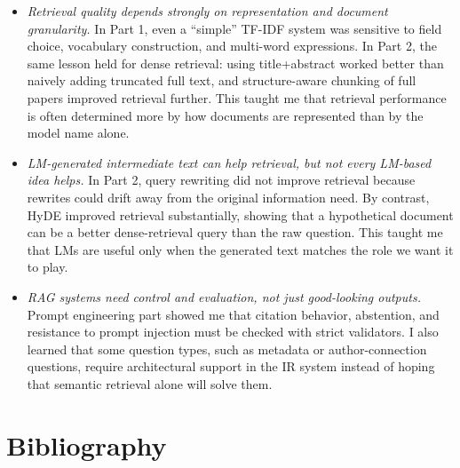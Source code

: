 \documentclass[a4paper,11pt]{article}
\begin{document}
\begin{itemize}
  \item \textit{Retrieval quality depends strongly on representation and document granularity.} In Part 1, even a ``simple'' TF-IDF system was sensitive to field choice, vocabulary construction, and multi-word expressions. In Part 2, the same lesson held for dense retrieval: using title+abstract worked better than naively adding truncated full text, and structure-aware chunking of full papers improved retrieval further. This taught me that retrieval performance is often determined more by how documents are represented than by the model name alone.

  \item \textit{LM-generated intermediate text can help retrieval, but not every LM-based idea helps.} In Part 2, query rewriting did not improve retrieval because rewrites could drift away from the original information need. By contrast, HyDE improved retrieval substantially, showing that a hypothetical document can be a better dense-retrieval query than the raw question. This taught me that LMs are useful only when the generated text matches the role we want it to play.

  \item \textit{RAG systems need control and evaluation, not just good-looking outputs.} Prompt engineering part showed me that citation behavior, abstention, and resistance to prompt injection must be checked with strict validators. I also learned that some question types, such as metadata or author-connection questions, require architectural support in the IR system instead of hoping that semantic retrieval alone will solve them.
\end{itemize}

\newpage
\onecolumn
\appendix
\section*{Bibliography}
\printbibliography[heading=none]
\end{document}
